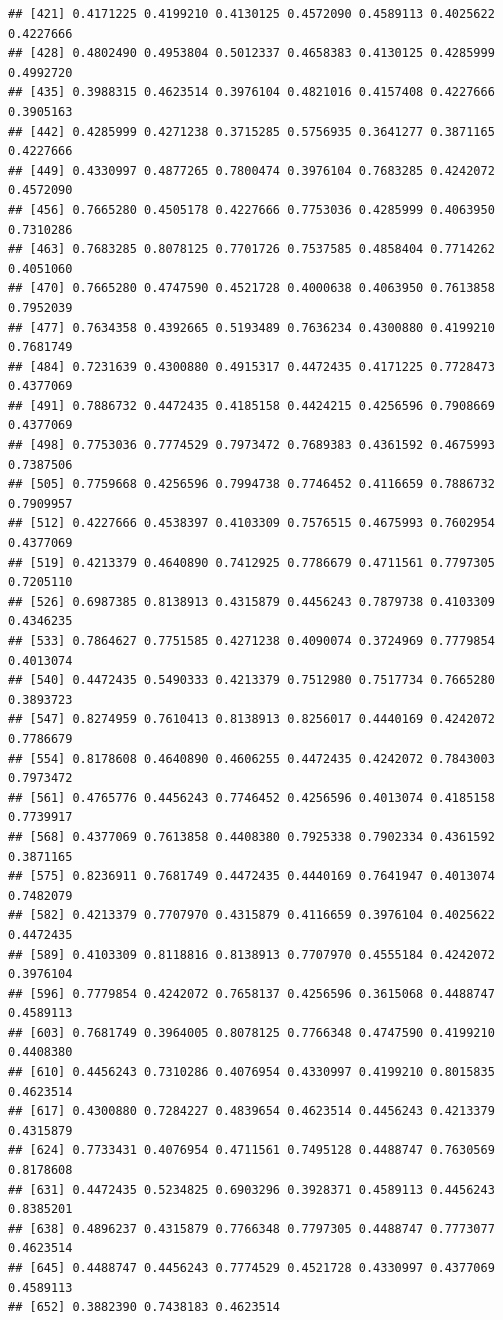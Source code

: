 \documentclass[
  american,
  man,floatsintext]{apa7}
\begin{document}
\begin{verbatim}
## [421] 0.4171225 0.4199210 0.4130125 0.4572090 0.4589113 0.4025622 0.4227666
## [428] 0.4802490 0.4953804 0.5012337 0.4658383 0.4130125 0.4285999 0.4992720
## [435] 0.3988315 0.4623514 0.3976104 0.4821016 0.4157408 0.4227666 0.3905163
## [442] 0.4285999 0.4271238 0.3715285 0.5756935 0.3641277 0.3871165 0.4227666
## [449] 0.4330997 0.4877265 0.7800474 0.3976104 0.7683285 0.4242072 0.4572090
## [456] 0.7665280 0.4505178 0.4227666 0.7753036 0.4285999 0.4063950 0.7310286
## [463] 0.7683285 0.8078125 0.7701726 0.7537585 0.4858404 0.7714262 0.4051060
## [470] 0.7665280 0.4747590 0.4521728 0.4000638 0.4063950 0.7613858 0.7952039
## [477] 0.7634358 0.4392665 0.5193489 0.7636234 0.4300880 0.4199210 0.7681749
## [484] 0.7231639 0.4300880 0.4915317 0.4472435 0.4171225 0.7728473 0.4377069
## [491] 0.7886732 0.4472435 0.4185158 0.4424215 0.4256596 0.7908669 0.4377069
## [498] 0.7753036 0.7774529 0.7973472 0.7689383 0.4361592 0.4675993 0.7387506
## [505] 0.7759668 0.4256596 0.7994738 0.7746452 0.4116659 0.7886732 0.7909957
## [512] 0.4227666 0.4538397 0.4103309 0.7576515 0.4675993 0.7602954 0.4377069
## [519] 0.4213379 0.4640890 0.7412925 0.7786679 0.4711561 0.7797305 0.7205110
## [526] 0.6987385 0.8138913 0.4315879 0.4456243 0.7879738 0.4103309 0.4346235
## [533] 0.7864627 0.7751585 0.4271238 0.4090074 0.3724969 0.7779854 0.4013074
## [540] 0.4472435 0.5490333 0.4213379 0.7512980 0.7517734 0.7665280 0.3893723
## [547] 0.8274959 0.7610413 0.8138913 0.8256017 0.4440169 0.4242072 0.7786679
## [554] 0.8178608 0.4640890 0.4606255 0.4472435 0.4242072 0.7843003 0.7973472
## [561] 0.4765776 0.4456243 0.7746452 0.4256596 0.4013074 0.4185158 0.7739917
## [568] 0.4377069 0.7613858 0.4408380 0.7925338 0.7902334 0.4361592 0.3871165
## [575] 0.8236911 0.7681749 0.4472435 0.4440169 0.7641947 0.4013074 0.7482079
## [582] 0.4213379 0.7707970 0.4315879 0.4116659 0.3976104 0.4025622 0.4472435
## [589] 0.4103309 0.8118816 0.8138913 0.7707970 0.4555184 0.4242072 0.3976104
## [596] 0.7779854 0.4242072 0.7658137 0.4256596 0.3615068 0.4488747 0.4589113
## [603] 0.7681749 0.3964005 0.8078125 0.7766348 0.4747590 0.4199210 0.4408380
## [610] 0.4456243 0.7310286 0.4076954 0.4330997 0.4199210 0.8015835 0.4623514
## [617] 0.4300880 0.7284227 0.4839654 0.4623514 0.4456243 0.4213379 0.4315879
## [624] 0.7733431 0.4076954 0.4711561 0.7495128 0.4488747 0.7630569 0.8178608
## [631] 0.4472435 0.5234825 0.6903296 0.3928371 0.4589113 0.4456243 0.8385201
## [638] 0.4896237 0.4315879 0.7766348 0.7797305 0.4488747 0.7773077 0.4623514
## [645] 0.4488747 0.4456243 0.7774529 0.4521728 0.4330997 0.4377069 0.4589113
## [652] 0.3882390 0.7438183 0.4623514
\end{verbatim}
\end{document}
